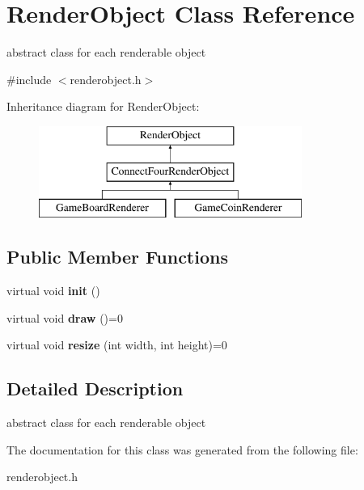 \hypertarget{classRenderObject}{\section{\-Render\-Object \-Class \-Reference}
\label{classRenderObject}
}


abstract class for each renderable object  




{\ttfamily \#include $<$renderobject.\-h$>$}

\-Inheritance diagram for \-Render\-Object\-:\begin{figure}[H]
\begin{center}
\leavevmode
\includegraphics[height=3.000000cm]{classRenderObject}
\end{center}
\end{figure}
\subsection*{\-Public \-Member \-Functions}
\begin{DoxyCompactItemize}
\item 
\hypertarget{classRenderObject_ac4cc404d2bada4f6652b94cdaa833502}{virtual void {\bfseries init} ()}\label{classRenderObject_ac4cc404d2bada4f6652b94cdaa833502}

\item 
\hypertarget{classRenderObject_aa4578bf61a73304b8613727cd89ee576}{virtual void {\bfseries draw} ()=0}\label{classRenderObject_aa4578bf61a73304b8613727cd89ee576}

\item 
\hypertarget{classRenderObject_a46fffcc84648ad62836cab723c8c1f58}{virtual void {\bfseries resize} (int width, int height)=0}\label{classRenderObject_a46fffcc84648ad62836cab723c8c1f58}

\end{DoxyCompactItemize}


\subsection{\-Detailed \-Description}
abstract class for each renderable object 

\-The documentation for this class was generated from the following file\-:\begin{DoxyCompactItemize}
\item 
renderobject.\-h\end{DoxyCompactItemize}
